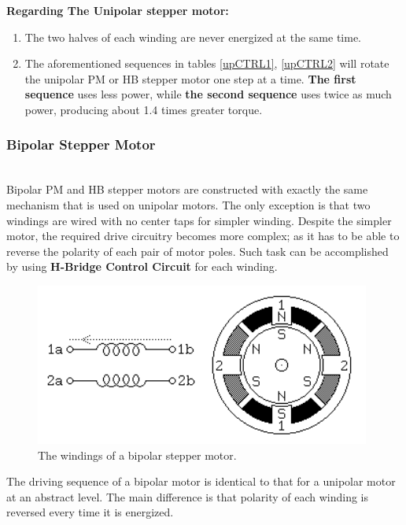 \documentclass[journal]{IEEEtran}
\begin{document}
\textbf{Regarding The Unipolar stepper motor:} \\
\begin{enumerate}
    \item The two halves of each winding are never energized at the same time.
    \item The aforementioned sequences in tables \ref{upCTRL1}, \ref{upCTRL2} will rotate the unipolar PM or HB stepper motor one step at a time. \textbf{The first sequence} uses less power, while \textbf{the second sequence} uses twice as much power, producing about 1.4 times greater torque.
\end{enumerate}

\subsubsection{Bipolar Stepper Motor}\hfill\\
Bipolar PM and HB stepper motors are constructed with exactly the same mechanism that is used on unipolar motors. The only exception is that two windings are wired with no center taps for simpler winding. Despite the simpler motor, the required drive circuitry becomes more complex; as it has to be able to reverse the polarity of each pair of motor poles. Such task can be accomplished by using \textbf{H-Bridge Control Circuit} for each winding.\\

\begin{figure}[h]
    \centering
    \includegraphics[scale=0.64]{Stepper/bPStep.png}
    \caption{The windings of a bipolar stepper motor.}
    \label{bpS}
\end{figure}
The driving sequence of a bipolar motor is identical to that for a unipolar motor at an abstract level. The main difference is that polarity of each winding is reversed every time it is energized.\\
\end{document}
